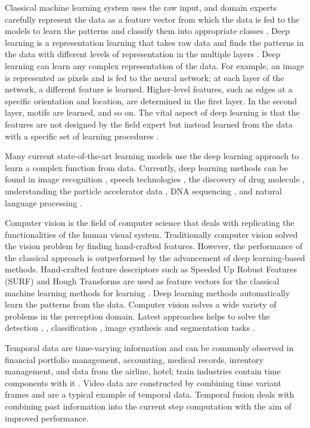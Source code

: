     Classical machine learning system uses the raw input, and domain experts carefully represent the data as a feature vector from which the data is fed to the models to learn the patterns and classify them into appropriate classes \cite{36_lecun2015deep}. 
    Deep learning is a representation learning that takes raw data and finds the patterns in the data with different levels of representation in the multiple layers \cite{36_lecun2015deep}. Deep learning can learn any complex representation of the data. For example, an image is represented as pixels and is fed to the neural network; at each layer of the network, a different feature is learned. Higher-level features, such as edges at a specific orientation and location, are determined in the first layer. In the second layer, motifs are learned, and so on. The vital aspect of deep learning is that the features are not designed by the field expert but instead learned from the data with a specific set of learning procedures \cite{36_lecun2015deep}.
    
	Many current state-of-the-art learning models use the deep learning approach to learn a complex function from data. Currently, deep learning methods can be found in image recognition \cite{37_farabet2012learning}, speech technologies \cite{38_hinton2012deep}, the discovery of drug molecule \cite{39_patel2020machine}, understanding the particle accelerator data \cite{40_ciodaro2012online}, DNA sequencing \cite{41_zhang2021deep}, and natural language processing \cite{42_hirschberg2015advances}. 
    
    Computer vision is the field of computer science that deals with replicating the functionalities of the human visual system. Traditionally computer vision solved the vision problem by finding hand-crafted features. However, the performance of the classical approach is outperformed by the advancement of deep learning-based methods. Hand-crafted feature descriptors such as Speeded Up Robust Features (SURF) and Hough Transforms are used as feature vectors for the classical machine learning methods for learning \cite{46_o2019deep}. Deep learning methods automatically learn the patterns from the data. Computer vision solves a wide variety of problems in the perception domain. Latest approaches helps to solve the detection \cite{44_mohanty2016using}, \cite{45_han2021ecological}, classification \cite{43_srivastava2021comparative}, image synthesis and segmentation tasks \cite{47_minaee2021image}.
    
	Temporal data are time-varying information and can be commonly observed in financial portfolio management, accounting, medical records, inventory management, and data from the airline, hotel; train industries contain time components with it \cite{48_jensen1999temporal}. Video data are constructed by combining time variant frames and are a typical example of temporal data. Temporal fusion deals with combining past information into the current step computation with the aim of improved performance. 
    
